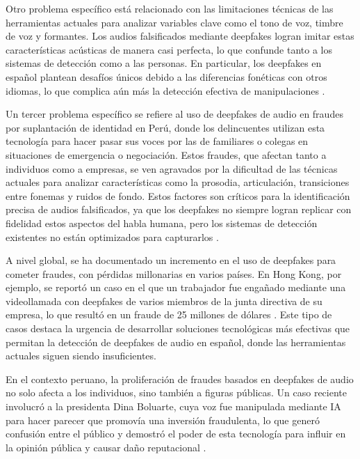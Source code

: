 Otro problema específico está relacionado con las limitaciones técnicas de las herramientas actuales para analizar variables clave como el tono de voz, timbre de voz y formantes. Los audios falsificados mediante deepfakes logran imitar estas características acústicas de manera casi perfecta, lo que confunde tanto a los sistemas de detección como a las personas. En particular, los deepfakes en español plantean desafíos únicos debido a las diferencias fonéticas con otros idiomas, lo que complica aún más la detección efectiva de manipulaciones \parencite{amesquita2023}.

Un tercer problema específico se refiere al uso de deepfakes de audio en fraudes por suplantación de identidad en Perú, donde los delincuentes utilizan esta tecnología para hacer pasar sus voces por las de familiares o colegas en situaciones de emergencia o negociación. Estos fraudes, que afectan tanto a individuos como a empresas, se ven agravados por la dificultad de las técnicas actuales para analizar características como la prosodia, articulación, transiciones entre fonemas y ruidos de fondo. Estos factores son críticos para la identificación precisa de audios falsificados, ya que los deepfakes no siempre logran replicar con fidelidad estos aspectos del habla humana, pero los sistemas de detección existentes no están optimizados para capturarlos \parencite{chen2024}.

A nivel global, se ha documentado un incremento en el uso de deepfakes para cometer fraudes, con pérdidas millonarias en varios países. En Hong Kong, por ejemplo, se reportó un caso en el que un trabajador fue engañado mediante una videollamada con deepfakes de varios miembros de la junta directiva de su empresa, lo que resultó en un fraude de 25 millones de dólares \parencite{chen2024}. Este tipo de casos destaca la urgencia de desarrollar soluciones tecnológicas más efectivas que permitan la detección de deepfakes de audio en español, donde las herramientas actuales siguen siendo insuficientes.

En el contexto peruano, la proliferación de fraudes basados en deepfakes de audio no solo afecta a los individuos, sino también a figuras públicas. Un caso reciente involucró a la presidenta Dina Boluarte, cuya voz fue manipulada mediante IA para hacer parecer que promovía una inversión fraudulenta, lo que generó confusión entre el público y demostró el poder de esta tecnología para influir en la opinión pública y causar daño reputacional \parencite{amesquita2023}.

